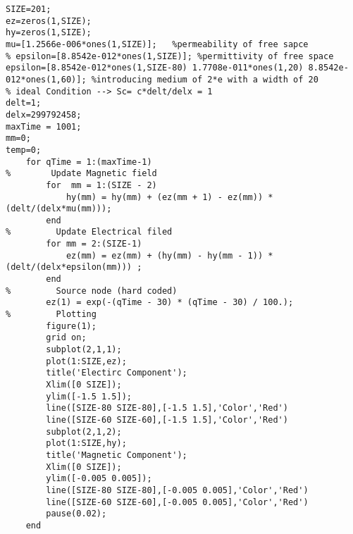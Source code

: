 \begin{lstlisting}
SIZE=201;
ez=zeros(1,SIZE);
hy=zeros(1,SIZE);
mu=[1.2566e-006*ones(1,SIZE)];   %permeability of free sapce
% epsilon=[8.8542e-012*ones(1,SIZE)]; %permittivity of free space 
epsilon=[8.8542e-012*ones(1,SIZE-80) 1.7708e-011*ones(1,20) 8.8542e-012*ones(1,60)]; %introducing medium of 2*e with a width of 20
% ideal Condition --> Sc= c*delt/delx = 1
delt=1;
delx=299792458;
maxTime = 1001;
mm=0;
temp=0;
    for qTime = 1:(maxTime-1)
%        Update Magnetic field
        for  mm = 1:(SIZE - 2)
            hy(mm) = hy(mm) + (ez(mm + 1) - ez(mm)) * (delt/(delx*mu(mm)));
        end
%         Update Electrical filed
        for mm = 2:(SIZE-1)
            ez(mm) = ez(mm) + (hy(mm) - hy(mm - 1)) * (delt/(delx*epsilon(mm))) ;
        end
%         Source node (hard coded)
        ez(1) = exp(-(qTime - 30) * (qTime - 30) / 100.);
%         Plotting
        figure(1);
        grid on; 
        subplot(2,1,1);
        plot(1:SIZE,ez);
        title('Electirc Component');
        Xlim([0 SIZE]);
        ylim([-1.5 1.5]);
        line([SIZE-80 SIZE-80],[-1.5 1.5],'Color','Red')
        line([SIZE-60 SIZE-60],[-1.5 1.5],'Color','Red')
        subplot(2,1,2);
        plot(1:SIZE,hy);
        title('Magnetic Component');
        Xlim([0 SIZE]);
        ylim([-0.005 0.005]);
        line([SIZE-80 SIZE-80],[-0.005 0.005],'Color','Red')
        line([SIZE-60 SIZE-60],[-0.005 0.005],'Color','Red')
        pause(0.02);
    end
\end{lstlisting}

